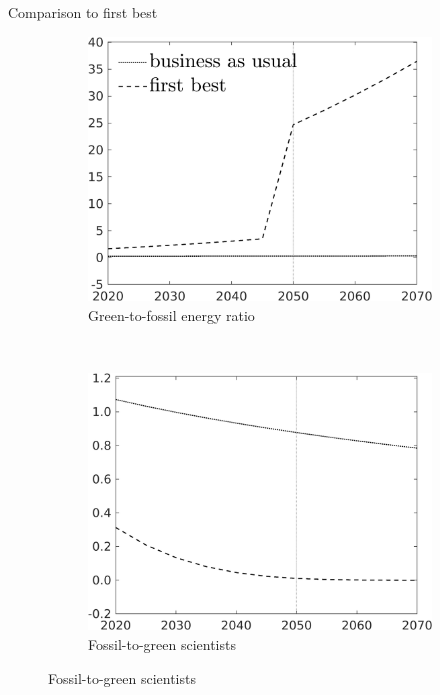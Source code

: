 \documentclass[11pt,aspectratio=169]{beamer}
\begin{document}
\begin{frame}{Comparison to first best}

\begin{figure}[h!!]
	\centering
	\begin{subfigure}{0.45\textwidth}		
		\caption{{Green-to-fossil energy ratio}}
		\includegraphics[width=1\textwidth]{../codding_model/own_basedOnFried/optimalPol_010922_revision/figures/all_13Sept22/NewCalib_effBAU_T_GFF_Sun2_emnet1_spillover0_knspil3_xgr0_nsk0_sep0_extern0_PV1_etaa0.79_lgd1.png}
	\end{subfigure}
	\begin{minipage}[]{0.05\textwidth}
		\
	\end{minipage}
	\begin{subfigure}{0.45\textwidth}		
		\caption{{Fossil-to-green scientists}}
		\includegraphics[width=1\textwidth]{../codding_model/own_basedOnFried/optimalPol_010922_revision/figures/all_13Sept22/NewCalib_effBAU_T_sffsg_Sun2_emnet1_spillover0_knspil3_xgr0_nsk0_sep0_extern0_PV1_etaa0.79_lgd0.png}

\end{subfigure}
\end{figure}
\end{frame}
\end{document}
